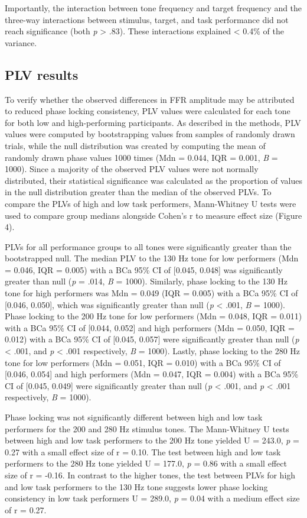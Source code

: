 Importantly, the interaction between tone frequency and target frequency and the three-way interactions between stimulus, target, and task performance did not reach significance (both \textit{p} > .83). These interactions explained < 0.4\% of the variance. 





\subsection*{PLV results}
To verify whether the observed differences in FFR amplitude may be attributed to reduced phase locking consistency, PLV values were calculated for each tone for both low and high-performing participants. As described in the methods, PLV values were computed by bootstrapping values from samples of randomly drawn trials, while the null distribution was created by computing the mean of randomly drawn phase values 1000 times (Mdn = 0.044, IQR = 0.001, \textit{B} = 1000). Since a majority of the observed PLV values were not normally distributed, their statistical significance was calculated as the proportion of values in the null distribution greater than the median of the observed PLVs. To compare the PLVs of high and low task performers, Mann-Whitney U tests were used to compare group medians alongside Cohen’s r to measure effect size (Figure 4).

PLVs for all performance groups to all tones were significantly greater than the bootstrapped null. The median PLV to the 130 Hz tone for low performers (Mdn = 0.046, IQR = 0.005) with a BCa 95\% CI of [0.045, 0.048] was significantly greater than null (\textit{p} = .014, \textit{B} = 1000). Similarly, phase locking to the 130 Hz tone for high performers was Mdn = 0.049 (IQR = 0.005) with a BCa 95\% CI of [0.046, 0.050], which was significantly greater than null (\textit{p} < .001, \textit{B} = 1000). Phase locking to the 200 Hz tone for low performers (Mdn = 0.048, IQR = 0.011) with a BCa 95\% CI of [0.044, 0.052] and high performers (Mdn = 0.050, IQR = 0.012) with a BCa 95\% CI of [0.045, 0.057] were significantly greater than null (\textit{p} < .001, and \textit{p} <  .001 respectively, \textit{B} = 1000). Lastly, phase locking to the 280 Hz tone for low performers (Mdn = 0.051, IQR = 0.010) with a BCa 95\% CI of [0.046, 0.054] and high performers (Mdn = 0.047, IQR = 0.004) with a BCa 95\% CI of [0.045, 0.049] were significantly greater than null (\textit{p} < .001, and \textit{p} < .001 respectively, \textit{B} = 1000).

Phase locking was not significantly different between high and low task performers for the 200 and 280 Hz stimulus tones. The Mann-Whitney U tests between high and low task performers to the 200 Hz tone yielded U = 243.0, \textit{p} = 0.27 with a small effect size of r = 0.10. The test between high and low task performers to the 280 Hz tone yielded U = 177.0, \textit{p} = 0.86 with a small effect size of r = -0.16. In contrast to the higher tones, the test between PLVs for high and low task performers to the 130 Hz tone suggests lower phase locking consistency in low task performers U = 289.0, \textit{p} = 0.04 with a medium effect size of r = 0.27.

